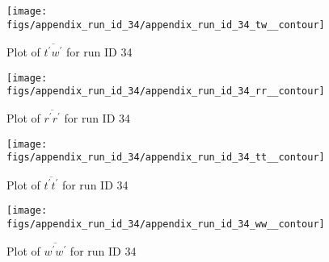 \begin{figure}[H]
\centering
\texttt{[image: figs/appendix\_run\_id\_34/appendix\_run\_id\_34\_tw\_\_contour]}
\caption{Plot of $\overline{t^\prime w^\prime}$ for run ID 34}
\label{fig:appendix_run_id_34_tw__contour}
\end{figure}


\begin{figure}[H]
\centering
\texttt{[image: figs/appendix\_run\_id\_34/appendix\_run\_id\_34\_rr\_\_contour]}
\caption{Plot of $\overline{r^\prime r^\prime}$ for run ID 34}
\label{fig:appendix_run_id_34_rr__contour}
\end{figure}


\begin{figure}[H]
\centering
\texttt{[image: figs/appendix\_run\_id\_34/appendix\_run\_id\_34\_tt\_\_contour]}
\caption{Plot of $\overline{t^\prime t^\prime}$ for run ID 34}
\label{fig:appendix_run_id_34_tt__contour}
\end{figure}


\begin{figure}[H]
\centering
\texttt{[image: figs/appendix\_run\_id\_34/appendix\_run\_id\_34\_ww\_\_contour]}
\caption{Plot of $\overline{w^\prime w^\prime}$ for run ID 34}
\label{fig:appendix_run_id_34_ww__contour}
\end{figure}


